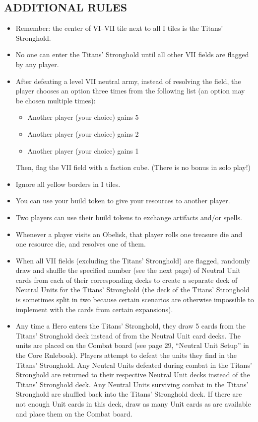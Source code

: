 \begin{multicols*}{2}
\subsection*{\MakeUppercase{Additional Rules}}
\begin{itemize}
  \item Remember: the center of VI--VII tile next to all I tiles is the Titans' Stronghold.
  \item No one can enter the Titans' Stronghold until all other VII fields are flagged by any player.
  \item After defeating a level VII neutral army, instead of resolving the field, the player chooses an option three times from the following list (an option may be chosen multiple times):
    \begin{itemize}[leftmargin=12pt]
      \item Another player (your choice) gains 5 
      \item Another player (your choice) gains 2 
      \item Another player (your choice) gains 1 
    \end{itemize}
  Then, flag the VII field with a faction cube.
  (There is no bonus in solo play!)
  \item Ignore all yellow borders in I tiles.
  \item You can use your build token to give your resources to another player.
  \item Two players can use their build tokens to exchange artifacts and/or spells.
  \item Whenever a player visits an Obelisk, that player rolls one treasure die and one resource die, and resolves one of them.
  \item When all VII fields (excluding the Titans' Stronghold) are flagged, randomly draw and shuffle the specified number (see the next page) of Neutral Unit cards from each of their corresponding decks to create a separate deck of Neutral Units for the Titans' Stronghold (the deck of the Titans' Stronghold is sometimes split in two because certain scenarios are otherwise impossible to implement with the cards from certain expansions).
  \item Any time a Hero enters the Titans' Stronghold, they draw 5 cards from the Titans' Stronghold deck instead of from the Neutral Unit card decks. The units are placed on the Combat board (see page 29, ``Neutral Unit Setup'' in the Core Rulebook). Players attempt to defeat the units they find in the Titans' Stronghold. Any Neutral Units defeated during combat in the Titans' Stronghold are returned to their respective Neutral Unit decks instead of the Titans' Stronghold deck. Any Neutral Units surviving combat in the Titans' Stronghold are shuffled back into the Titans' Stronghold deck. If there are not enough Unit cards in this deck, draw as many Unit cards as are available and place them on the Combat board.

\end{itemize}
\end{multicols*}
